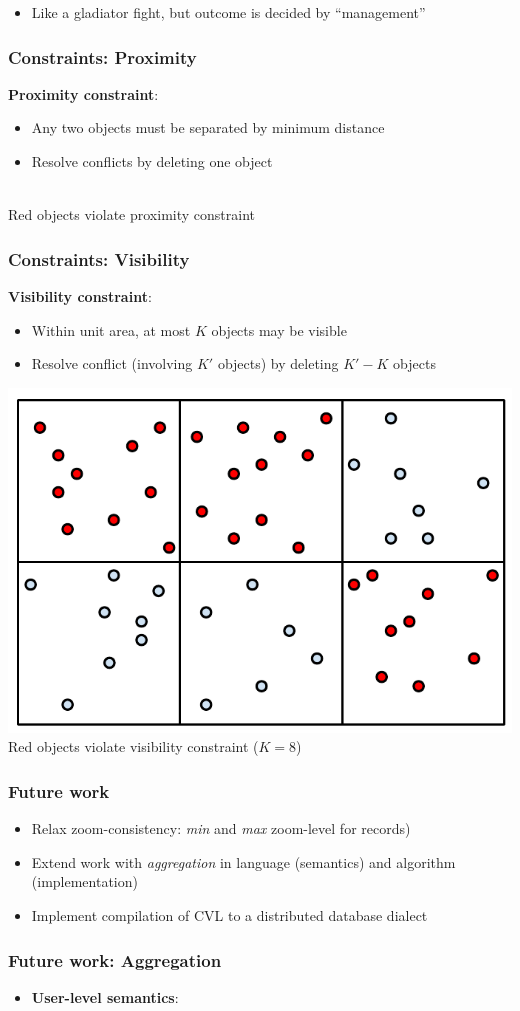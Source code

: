 \documentclass{beamer}
\begin{document}
{  \begin{center}
  	  
  \end{center}
  
    \begin{itemize}
  \item Like a gladiator fight, but outcome is decided by ``management''
  \end{itemize}

}

\frame
{
  \frametitle{Constraints: Proximity}
  \textbf{Proximity constraint}:
  \begin{itemize}
  \item Any two objects must be separated by minimum distance
  \item Resolve conflicts by deleting one object
  \end{itemize}
  \begin{center}
   \\
  \small{Red objects violate proximity constraint}
  \end{center}
}

\frame
{
  \frametitle{Constraints: Visibility}
  \textbf{Visibility constraint}:  
  \begin{itemize}
  \item Within unit area, at most $K$ objects may be visible
  \item Resolve conflict (involving $K'$ objects) by deleting $K' - K$ objects
  \end{itemize}
  \begin{center}
  \includegraphics[scale=0.4]{figs/cvl-visibility.pdf} \\
  \small{Red objects violate visibility constraint ($K=8$)}
  \end{center}
}

\frame
{
  \frametitle{Future work}
  \begin{itemize}
  \item Relax zoom-consistency: \emph{min} and \emph{max} zoom-level for records)
  \item Extend work with \emph{aggregation} in language (semantics) and algorithm (implementation)
  \item Implement compilation of CVL to a distributed database dialect
  \end{itemize}
}

\frame
{
  \frametitle{Future work: Aggregation}
  \begin{center}
  \end{center}

  \begin{itemize}
  \item \textbf{User-level semantics}:
  \begin{itemize}
  \item How should user \emph{understan
\end{itemize}
\end{itemize}}
\end{document}
